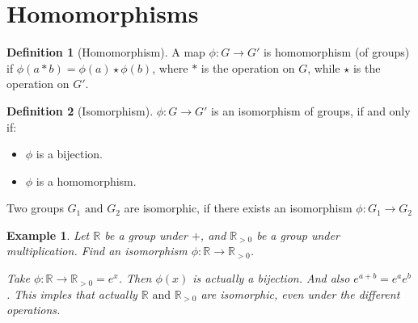 \documentclass{article}
\theoremstyle{MyNonumberplain}
\theoremstyle{break}
\newcommand{\infixand}{\text{ and }}
\theoremstyle{break}
\newtheorem{example}{Example}[section]
\theoremstyle{break}
\theoremstyle{definition}
\theoremstyle{break}
\newtheorem{definition}{Definition}[section]
\begin{document}
\setcounter{section}{12}

\section{Homomorphisms}

\begin{defbox}
    \begin{definition}[Homomorphism]
        A map $\phi : G \rightarrow G'$ is homomorphism (of groups) if $\phi (a \ast
        b) = \phi (a) \star \phi (b)$, where $\ast$ is the operation on $G$, while $\star$ is the operation on $G'$. 
    \end{definition}
\end{defbox}

\begin{defbox}
    \begin{definition}[Isomorphism]
        $\phi : G \rightarrow G'$ is an isomorphism of groups, if and only if:\bigskip
        \begin{itemize}
        \item $\phi$ is a bijection.\bigskip
        
        \item $\phi$ is a homomorphism.\bigskip
        \end{itemize}
        Two groups $G_1 \infixand G_2$ are isomorphic, if there exists an isomorphism
        $\phi : G_1 \rightarrow G_2$
    \end{definition}
\end{defbox}

\begin{expbox}
    \begin{example}
        Let $\mathbb{R}$ be a group under $+$, and $\mathbb{R}_{> 0}$ be a group under
        multiplication. Find an isomorphism $\phi : \mathbb{R} \rightarrow
        \mathbb{R}_{> 0}$.
        
            \begin{ansbox}
                Take $\phi : \mathbb{R} \rightarrow \mathbb{R}_{> 0} = e^x$. Then $\phi (x)$
                is actually a bijection. And also $e^{a + b} = e^a e^b$. This imples that
                actually $\mathbb{R} \infixand \mathbb{R}_{> 0}$ are isomorphic, even under the different operations. 
            \end{ansbox}

    \end{example}
\end{expbox}
\end{document}
